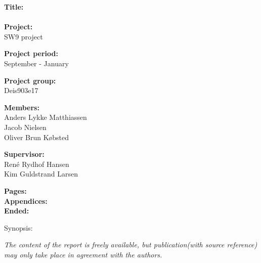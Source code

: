 \begin{minipage}[t]{0.48\textwidth}
\textbf{Title:} \\[5pt]\hspace{2ex}
\\

\textbf{Project:} \\[5pt]\bigskip\hspace{2ex}
SW9 project

\textbf{Project period:} \\[5pt]\bigskip\hspace{2ex}
 September -  January

\textbf{Project group:} \\[5pt]\bigskip\hspace{2ex}
Deis903e17

\textbf{Members:} \\[5pt]\hspace*{2ex}
Anders Lykke Matthiassen \\\hspace*{2ex}
Jacob Nielsen \\\hspace*{2ex}
Oliver Brun Købsted 


\textbf{Supervisor:} \\[5pt]\hspace*{2ex}
René Rydhof Hansen\\
Kim Guldstrand Larsen

\vspace*{1cm}

\textbf{Pages: } \\
\textbf{Appendices: } \\
\textbf{Ended: }

\end{minipage}
\hfill
\begin{minipage}[t]{0.483\textwidth}
Synopsis: \\[5pt]
\fbox{\parbox{7cm}{\bigskip\bigskip}}
\end{minipage}

\vfill

{\footnotesize\itshape The content of the report is freely available, but publication(with source reference) may only take place in agreement with the authors.}
